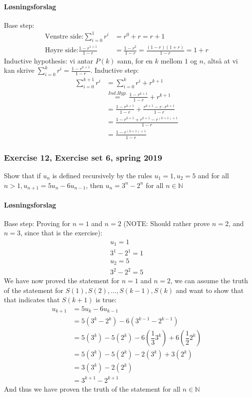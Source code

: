 \paragraph*{Løsningsforslag}
Base step: \begin{align*}
\text{Venstre side:} \sum_{i=0}^{1} r^i &= r^0+r = r+1\\
\text{Høyre side:} \frac{1-r^{1+1}}{1-r} &= \frac{1-r^2}{1-r}= \frac{(1-r)(1+r)}{1-r} = 1+r
\end{align*}
Inductive hypothesis: vi antar $P(k)$ sann, for en $k$ mellom $1$ og $n$, altså at vi kan skrive $\sum_{i=0}^{k}r^i = \frac{1-r^{k+1}}{1-r}$.
Inductive step:
\begin{align*}
    \sum_{i=0}^{k+1} r^i &= \sum_{i=0}^{k} r^i + r^{k+1}\\
    &\overset{Ind.Hyp.}{=} \frac{1-r^{k+1}}{1-r} + r^{k+1}\\
    &= \frac{1-r^{k+1}}{1-r} + \frac{r^{k+1}-r\cdot r^{k+1}}{1-r}\\
    &= \frac{1-r^{k+1}+r^{k+1}-r^{(k+1)+1}}{1-r}\\
    &= \frac{1-r^{(k+1)+1}}{1-r}
\end{align*}


\subsubsection{Exercise 12, Exercise set 6, spring 2019}
Show that if $u_n$ is defined recursively by the 
rules $u_1 = 1,u_2 = 5$ and for all $n>1,u_{n+1}= 5u_n -6u_{n-1}$, then $u_n = 3^n - 2^n$ for all $n\in \mathbb{N}$
\paragraph*{Løsningsforslag}
Base step: Proving for $n=1$ and $n=2$ (NOTE: Should rather prove $n=2$, and $n=3$, since that is the exercise):
\begin{align*}
    u_1 = 1\\
    3^1-2^1 = 1\\
    u_2 = 5\\
    3^2-2^2 = 5
\end{align*}
We have now proved the statement for $n=1$ and $n=2$, we can assume the truth of the statement for $S(1), S(2), \dots,S(k-1), S(k)$ and want to show that that indicates that $S(k+1)$ is true:
\begin{align*}
    u_{k+1} &= 5u_{k}-6u_{k-1}\\
    &= 5(3^k-2^k)-6(3^{k-1}-2^{k-1})\\
    &= 5(3^k)-5(2^k)-6(\dfrac{1}{3}3^k)+6(\dfrac{1}{2}2^k)\\
    &= 5(3^k)-5(2^k)-2(3^k)+3(2^k)\\
    &= 3(3^k)-2(2^k)\\
    &= 3^{k+1}-2^{k+1}
\end{align*}
And thus we have proven the truth of the statement for all $n \in \mathbb{N}$

